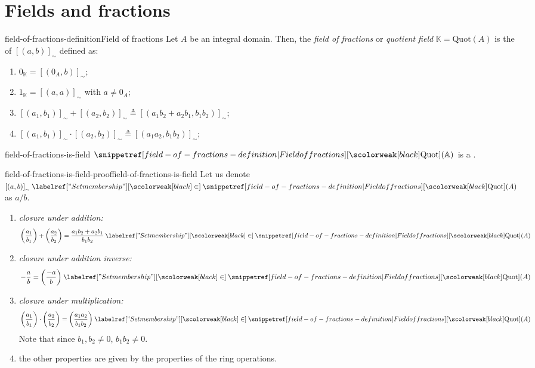 \documentclass[preview]{standalone}
\begin{document}
\genpage

\section{Fields and fractions}



\begin{snippetdefinition}{field-of-fractions-definition}{Field of fractions}
    Let \(A\) be an integral domain.
    Then, the \emph{field of fractions} or \emph{quotient field}
    \(\mathbb{K} = \text{Quot}(A)\) is the \set of 
    \({[(a,b)]}_\sim\) defined as:
    \begin{enumerate}
        \item \(0_\mathbb{K} = {[(0_A,b)]}_\sim\);
        \item \(1_\mathbb{K} = {[(a,a)]}_\sim\) with \(a \neq 0_A\);
        \item \({[(a_1,b_1)]}_\sim + {[(a_2,b_2)]}_\sim \triangleq {[(a_1b_2 + a_2b_1,b_1b_2)]}_\sim\);
        \item \({[(a_1,b_1)]}_\sim \cdot {[(a_2,b_2)]}_\sim \triangleq {[(a_1a_2,b_1b_2)]}_\sim\);
    \end{enumerate}        
\end{snippetdefinition}

\begin{snippetproposition}{field-of-fractions-is-field}{}
    \(\quotientfield(\mathbb{A})\) is a \field.
\end{snippetproposition}

\begin{snippetproof}{field-of-fractions-is-field-proof}{field-of-fractions-is-field}{}
    Let us denote \({[(a,b)]}_\sim \in \quotientfield(A)\) as \(a/b\).
    \begin{enumerate}
        \item \emph{closure under addition:} \[
            \left(\frac{a_1}{b_1}\right)
            + \left(\frac{a_2}{b_2}\right)
            = \frac{a_1b_2 + a_2b_1}{b_1b_2} \in \quotientfield(A)
        \]
        \item \emph{closure under addition inverse:}
        \[ -\frac{a}{b} = \left(\frac{-a}{b}\right) \in \quotientfield(A) \]
        \item \emph{closure under multiplication:} \[
            \left(\frac{a_1}{b_1}\right)
            \cdot
            \left(\frac{a_2}{b_2}\right)
            = 
            \left(\frac{a_1a_2}{b_1b_2}\right)\in \quotientfield(A)
        \]
        Note that since \(b_1, b_2 \neq 0\), \(b_1b_2 \neq 0\).
        \item the other properties are given by the properties of the ring operations.
    \end{enumerate}
\end{snippetproof}
\end{document}
